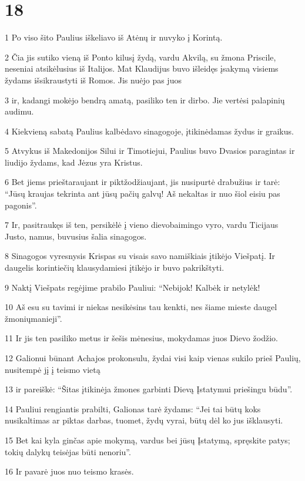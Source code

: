 \chapter{18}


\par 1 Po viso šito Paulius iškeliavo iš Atėnų ir nuvyko į Korintą. 
\par 2 Čia jis sutiko vieną iš Ponto kilusį žydą, vardu Akvilą, su žmona Priscile, neseniai atsikėlusius iš Italijos. Mat Klaudijus buvo išleidęs įsakymą visiems žydams išsikraustyti iš Romos. Jis nuėjo pas juos 
\par 3 ir, kadangi mokėjo bendrą amatą, pasiliko ten ir dirbo. Jie vertėsi palapinių audimu. 
\par 4 Kiekvieną sabatą Paulius kalbėdavo sinagogoje, įtikinėdamas žydus ir graikus. 
\par 5 Atvykus iš Makedonijos Silui ir Timotiejui, Paulius buvo Dvasios paragintas ir liudijo žydams, kad Jėzus yra Kristus. 
\par 6 Bet jiems prieštaraujant ir piktžodžiaujant, jis nusipurtė drabužius ir tarė: “Jūsų kraujas tekrinta ant jūsų pačių galvų! Aš nekaltas ir nuo šiol eisiu pas pagonis”. 
\par 7 Ir, pasitraukęs iš ten, persikėlė į vieno dievobaimingo vyro, vardu Ticijaus Justo, namus, buvusius šalia sinagogos. 
\par 8 Sinagogos vyresnysis Krispas su visais savo namiškiais įtikėjo Viešpatį. Ir daugelis korintiečių klausydamiesi įtikėjo ir buvo pakrikštyti. 
\par 9 Naktį Viešpats regėjime prabilo Pauliui: “Nebijok! Kalbėk ir netylėk! 
\par 10 Aš esu su tavimi ir niekas nesikėsins tau kenkti, nes šiame mieste daugel žmonių­manieji”. 
\par 11 Ir jis ten pasiliko metus ir šešis mėnesius, mokydamas juos Dievo žodžio. 
\par 12 Galionui būnant Achajos prokonsulu, žydai visi kaip vienas sukilo prieš Paulių, nusitempė jį į teismo vietą 
\par 13 ir pareiškė: “Šitas įtikinėja žmones garbinti Dievą Įstatymui priešingu būdu”. 
\par 14 Pauliui rengiantis prabilti, Galionas tarė žydams: “Jei tai būtų koks nusikaltimas ar piktas darbas, tuomet, žydų vyrai, būtų dėl ko jus išklausyti. 
\par 15 Bet kai kyla ginčas apie mokymą, vardus bei jūsų Įstatymą, spręskite patys; tokių dalykų teisėjas būti nenoriu”. 
\par 16 Ir pavarė juos nuo teismo krasės. 
